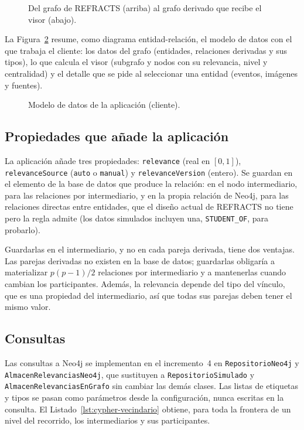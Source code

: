\begin{figure}[htbp]
  \centering
  \caption{Del grafo de REFRACTS (arriba) al grafo derivado que recibe el visor (abajo).}
  \label{fig:bd-derivacion}
\end{figure}

La Figura~\ref{fig:bd-app} resume, como diagrama entidad-relación, el modelo de datos con el que trabaja el cliente: los datos del grafo (entidades, relaciones derivadas y sus tipos), lo que calcula el visor (subgrafo y nodos con su relevancia, nivel y centralidad) y el detalle que se pide al seleccionar una entidad (eventos, imágenes y fuentes).

\begin{figure}[htbp]
  \centering
  \caption{Modelo de datos de la aplicación (cliente).}
  \label{fig:bd-app}
\end{figure}

\subsection{Propiedades que añade la aplicación}

La aplicación añade tres propiedades: \texttt{relevance} (real en $[0,1]$), \texttt{relevanceSource} (\texttt{auto} o \texttt{manual}) y \texttt{relevanceVersion} (entero). Se guardan en el elemento de la base de datos que produce la relación: en el nodo intermediario, para las relaciones por intermediario, y en la propia relación de Neo4j, para las relaciones directas entre entidades, que el diseño actual de REFRACTS no tiene pero la regla admite (los datos simulados incluyen una, \texttt{STUDENT\_OF}, para probarlo).

Guardarlas en el intermediario, y no en cada pareja derivada, tiene dos ventajas. Las parejas derivadas no existen en la base de datos; guardarlas obligaría a materializar $p(p-1)/2$ relaciones por intermediario y a mantenerlas cuando cambian los participantes. Además, la relevancia depende del tipo del vínculo, que es una propiedad del intermediario, así que todas sus parejas deben tener el mismo valor.

\subsection{Consultas}

Las consultas a Neo4j se implementan en el incremento~4 en \texttt{RepositorioNeo4j} y \texttt{AlmacenRelevanciasNeo4j}, que sustituyen a \texttt{RepositorioSimulado} y \texttt{AlmacenRelevanciasEnGrafo} sin cambiar las demás clases. Las listas de etiquetas y tipos se pasan como parámetros desde la configuración, nunca escritas en la consulta. El Listado~\ref{lst:cypher-vecindario} obtiene, para toda la frontera de un nivel del recorrido, los intermediarios y sus participantes.

